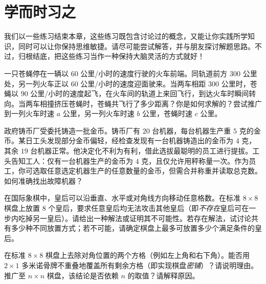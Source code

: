\section{学而时习之}\label{sec:section1.5}

我们以一些练习结束本章，这些练习既包含讨论过的概念，又能让你实践所学知识，同时可以让你保持思维敏捷。请尽可能尝试解答，并与朋友探讨解题思路。不过，归根结底，把这些练习当作一种保持大脑灵活的方式就好！\\

\begin{exercise}
    一只苍蝇停在一辆以 $60$ 公里/小时的速度行驶的火车前端。同轨道前方 $300$ 公里处，另一列火车正以 $60$ 公里/小时的速度迎面驶来。当两车相距 $300$ 公里时，苍蝇以 $90$ 公里/小时的速度起飞，在火车间的轨道上来回飞行，到达火车时瞬间转向。当两车相撞挤压苍蝇时，苍蝇共飞行了多少距离？你是如何求解的？尝试推广到一列火车时速 $a$ 公里，另一列火车时速 $b$ 公里，苍蝇时速 $c$ 公里。
\end{exercise}

\begin{exercise}
    政府铸币厂受委托铸造一批金币。铸币厂有 $20$ 台机器，每台机器生产重 $5$ 克的金币。某日工头发现部分金币偏轻，经检查发现有一台机器铸造出的金币为 $4$ 克，其余 $19$ 台机器正常。他决定化不利为有利，借此选拔最聪明的员工进行提拔。工头告知工人：仅有一台机器生产的金币为 $4$ 克，且仅允许用秤称量一次。作为员工，你可选取任意选定机器生产的任意数量的金币，但需合并称重并读取总克数。如何准确找出故障机器？
\end{exercise}

\begin{exercise}
    在国际象棋中，皇后可以沿垂直、水平或对角线方向移动任意格数。在标准 $8 \times 8$ 棋盘上放置 $8$ 个皇后，要求任意皇后均无法攻击其他皇后（即\emph{不存在}皇后可在一步内吃掉另一皇后）。请给出一种解法或证明其不可能性。若存在解法，试讨论共有多少种不同放置方式；若不可能，请确定棋盘上最多可放置多少个满足条件的皇后。
\end{exercise}

\begin{exercise}
    在标准 $8 \times 8$ 棋盘上去除对角位置的两个方格（例如左上角和右下角）。能否用 $2 \times 1$ 多米诺骨牌不重叠地覆盖所有剩余方格（即实现棋盘\emph{密铺}）？请说明理由。推广至 $n \times n$ 棋盘，该结论是否依赖 $n$ 的取值？请解释原因。
\end{exercise}

